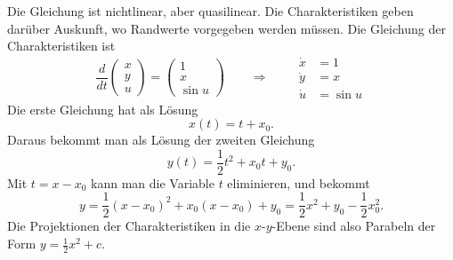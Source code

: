 \begin{loesung}
Die Gleichung ist nichtlinear, aber quasilinear.
Die Charakteristiken geben darüber Auskunft, wo Randwerte vorgegeben
werden müssen.
Die Gleichung der Charakteristiken ist 
\begin{equation}
\frac{d}{dt}\begin{pmatrix}x\\y\\u\end{pmatrix}
=
\begin{pmatrix}
1\\x\\\sin u
\end{pmatrix}
\qquad
\Rightarrow
\qquad
\begin{aligned}
\dot x &= 1\\
\dot y &= x\\
\dot u &=\sin u
\end{aligned}
\end{equation}
Die erste Gleichung hat als Lösung
\[
x(t) = t+x_0.
\]
Daraus bekommt man als Lösung der zweiten Gleichung
\[
y(t) = \frac12 t^2+x_0t+y_0.
\]
Mit $t=x-x_0$ kann man die Variable $t$ eliminieren, und
bekommt
\[
y=\frac12(x-x_0)^2+x_0(x-x_0)+y_0=\frac12x^2 + y_0-\frac12x_0^2.
\]
Die Projektionen der Charakteristiken in die $x$-$y$-Ebene sind also
Parabeln der Form $y=\frac12x^2+c$.


\end{loesung}
